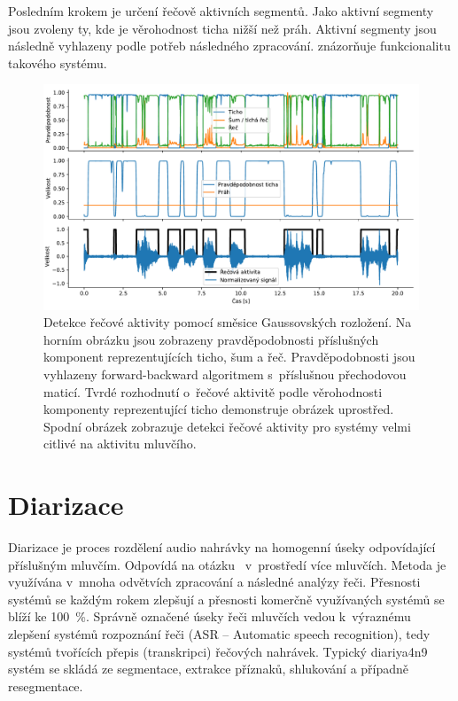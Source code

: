 Posledním krokem je určení řečově aktivních segmentů. Jako aktivní segmenty jsou zvoleny ty, kde je věrohodnost ticha nižší než práh. Aktivní segmenty jsou následně vyhlazeny podle potřeb následného zpracování.  znázorňuje funkcionalitu takového systému.
\begin{figure}[ht]
  \centering
  \includegraphics[width=\linewidth]{obrazky-figures/vad_gmm.pdf}
  \caption{Detekce řečové aktivity pomocí směsice Gaussovských rozložení. Na horním obrázku jsou zobrazeny pravděpodobnosti příslušných komponent reprezentujících ticho, šum a řeč. Pravděpodobnosti jsou vyhlazeny forward-backward algoritmem s~příslušnou přechodovou maticí. Tvrdé rozhodnutí o~řečové aktivitě podle věrohodnosti komponenty reprezentující ticho demonstruje obrázek uprostřed. Spodní obrázek zobrazuje detekci řečové aktivity pro systémy velmi citlivé na aktivitu mluvčího.}
  \label{fig:VAD_GMM}
\end{figure}


\section{Diarizace}
\label{section:Diarization}
Diarizace je proces rozdělení audio nahrávky na homogenní úseky odpovídající příslušným mluvčím. Odpovídá na otázku~ v~prostředí více mluvčích. Metoda je využívána v~mnoha odvětvích zpracování a následné analýzy řeči. Přesnosti systémů se každým rokem zlepšují a přesnosti komerčně využívaných systémů se blíží ke 100~\%. Správně označené úseky řeči mluvčích vedou k~výraznému zlepšení systémů rozpoznání řeči (ASR -- Automatic speech recognition), tedy systémů tvořících přepis (transkripci) řečových nahrávek. Typický diariya4n9 systém se skládá ze segmentace, extrakce příznaků, shlukování a případně resegmentace. 

